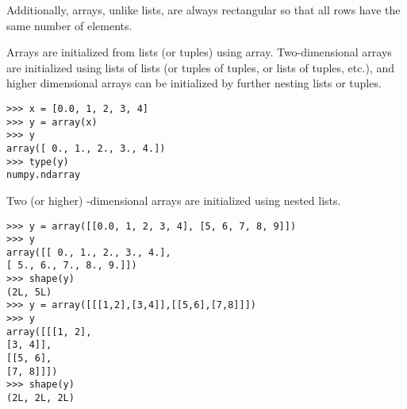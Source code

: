 \documentclass[Pydata.tex]{subfiles}
\begin{document}

Additionally, arrays, unlike lists, are always rectangular so that all rows have the same
number of elements.

Arrays are initialized from lists (or tuples) using array. Two-dimensional arrays are initialized using
lists of lists (or tuples of tuples, or lists of tuples, etc.), and higher dimensional arrays can be initialized by
further nesting lists or tuples.

\begin{framed}
\begin{verbatim}
>>> x = [0.0, 1, 2, 3, 4]
>>> y = array(x)
>>> y
array([ 0., 1., 2., 3., 4.])
>>> type(y)
numpy.ndarray
\end{verbatim}
\end{framed}
Two (or higher) -dimensional arrays are initialized using nested lists.
\begin{framed}
\begin{verbatim}
>>> y = array([[0.0, 1, 2, 3, 4], [5, 6, 7, 8, 9]])
>>> y
array([[ 0., 1., 2., 3., 4.],
[ 5., 6., 7., 8., 9.]])
>>> shape(y)
(2L, 5L)
>>> y = array([[[1,2],[3,4]],[[5,6],[7,8]]])
>>> y
array([[[1, 2],
[3, 4]],
[[5, 6],
[7, 8]]])
>>> shape(y)
(2L, 2L, 2L)
\end{verbatim}
\end{framed}
\end{document}
